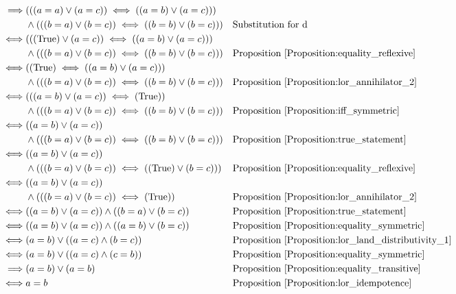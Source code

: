 \begin{prop}
\begin{align*}
& & \implies & (((a = a) \lor (a = c)) \iff ((a = b) \lor (a = c))) \\
& & & \land (((b = a) \lor (b = c)) \iff ((b = b) \lor (b = c)))
& & \text{Substitution for d} \\
& & \iff & (((\text{True}) \lor (a = c)) \iff ((a = b) \lor (a = c))) \\
& & & \land (((b = a) \lor (b = c)) \iff ((b = b) \lor (b = c)))
& & \text{Proposition \ref{Proposition:equality_reflexive}} \\
& & \iff & ((\text{True}) \iff ((a = b) \lor (a = c))) \\
& & & \land (((b = a) \lor (b = c)) \iff ((b = b) \lor (b = c)))
& & \text{Proposition \ref{Proposition:lor_annihilator_2}} \\
& & \iff & (((a = b) \lor (a = c)) \iff (\text{True})) \\
& & & \land (((b = a) \lor (b = c)) \iff ((b = b) \lor (b = c)))
& & \text{Proposition \ref{Proposition:iff_symmetric}} \\
& & \iff & ((a = b) \lor (a = c)) \\
& & & \land (((b = a) \lor (b = c)) \iff ((b = b) \lor (b = c)))
& & \text{Proposition \ref{Proposition:true_statement}} \\
& & \iff & ((a = b) \lor (a = c)) \\
& & & \land (((b = a) \lor (b = c)) \iff ((\text{True}) \lor (b = c)))
& & \text{Proposition \ref{Proposition:equality_reflexive}} \\
& & \iff & ((a = b) \lor (a = c)) \\
& & & \land (((b = a) \lor (b = c)) \iff (\text{True}))
& & \text{Proposition \ref{Proposition:lor_annihilator_2}} \\
& & \iff & ((a = b) \lor (a = c)) \land ((b = a) \lor (b = c))
& & \text{Proposition \ref{Proposition:true_statement}} \\
& & \iff & ((a = b) \lor (a = c)) \land ((a = b) \lor (b = c))
& & \text{Proposition \ref{Proposition:equality_symmetric}} \\
& & \iff & (a = b) \lor ((a = c) \land (b = c))
& & \text{Proposition \ref{Proposition:lor_land_distributivity_1}} \\
& & \iff & (a = b) \lor ((a = c) \land (c = b))
& & \text{Proposition \ref{Proposition:equality_symmetric}} \\
& & \implies & (a = b) \lor (a = b)
& & \text{Proposition \ref{Proposition:equality_transitive}} \\
& & \iff & a = b
& & \text{Proposition \ref{Proposition:lor_idempotence}} \\

\end{align*}
\end{prop}
